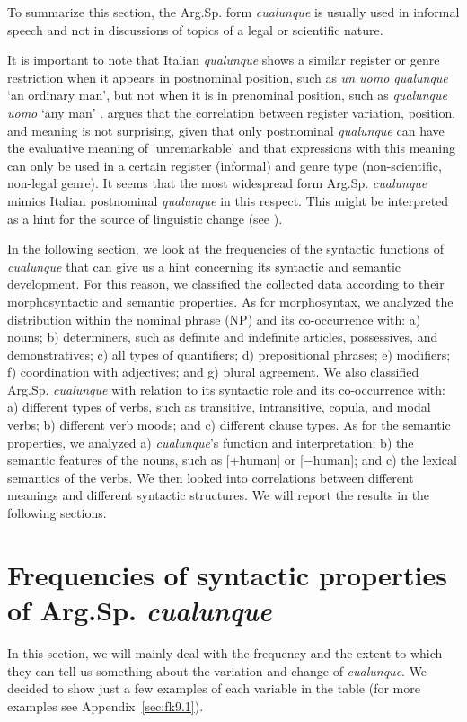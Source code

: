 \documentclass[output=paper,colorlinks,citecolor=brown]{langscibook}
\begin{document}
To summarize this section, the Arg.Sp. form \textit{cualunque} is usually used in informal speech and not in discussions of topics of a legal or scientific nature. 

It is important to note that Italian \textit{qualunque} shows a similar register or genre restriction when it appears in postnominal position, such as \textit{un uomo qualunque} ‘an ordinary man’, but not when it is in prenominal position, such as \textit{qualunque uomo} ‘any man’ \citep[see][]{Kellert2021a}. \citet{Kellert2021d} argues that the correlation between register variation, position, and meaning is not surprising, given that only postnominal \textit{qualunque} can have the evaluative meaning of ‘unremarkable’ and that expressions with this meaning can only be used in a certain register (informal) and genre type (non-scientific, non-legal genre). It seems that the most widespread form Arg.Sp. \textit{cualunque} mimics Italian postnominal \textit{qualunque} in this respect. This might be interpreted as a hint for the source of linguistic change (see  ).

In the following section, we look at the frequencies of the syntactic functions of \textit{cualunque} that can give us a hint concerning its syntactic and semantic development. For this reason, we classified the collected data according to their morphosyntactic and semantic properties. As for morphosyntax, we analyzed the distribution within the nominal phrase (NP) and its co-occurrence with: a) nouns; b) determiners, such as definite and indefinite articles, possessives, and demonstratives; c) all types of quantifiers; d) prepositional phrases; e) modifiers; f) coordination with adjectives; and g) plural agreement. We also classified Arg.Sp. \textit{cualunque} with relation to its syntactic role and its co-occurrence with: a) different types of verbs, such as transitive, intransitive, copula, and modal verbs; b) different verb moods; and c) different clause types. As for the semantic properties, we analyzed a) \textit{cualunque}’s function and interpretation; b) the semantic features of the nouns, such as [+human] or [$-$human]; and c) the lexical semantics of the verbs. We then looked into correlations between different meanings and different syntactic structures. We will report the results in the following sections.

\section{Frequencies of syntactic properties of Arg.Sp. \textit{cualunque}}\label{sec:fk4}
In this section, we will mainly deal with the frequency and the extent to which they can tell us something about the variation and change of \textit{cualunque}. We decided to show just a few examples of each variable in the table (for more examples see Appendix~\ref{sec:fk9.1}).
\end{document}

